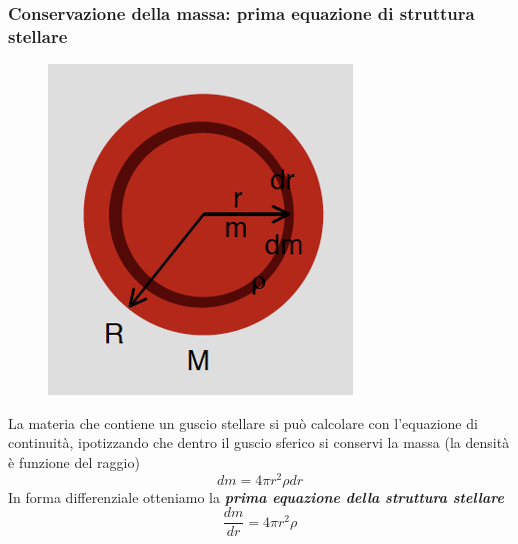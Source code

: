 \documentclass[a4paper,11pt]{article}
\begin{document}
\subsubsection{Conservazione della massa: prima equazione di struttura stellare}
\begin{figure}[h!]
    \centering
    \includegraphics{dr.png}
    \label{fig:my_label}
\end{figure}
La materia che contiene un guscio stellare si può calcolare con l'equazione di continuità, ipotizzando che dentro il guscio sferico si conservi la massa (la densità è funzione del raggio)
$$dm=4\pi r^2 \rho dr$$
In forma differenziale otteniamo la \textbf{\textit{prima equazione della struttura stellare}}
\begin{equation}
    \frac{dm}{dr}=4\pi r^2 \rho
    \label{struttura1}
\end{equation}
\end{document}
